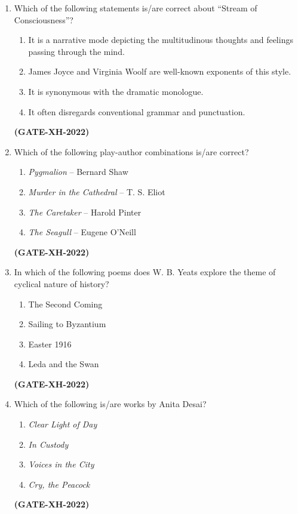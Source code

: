 \documentclass[journal]{IEEEtran}
\begin{document}
\begin{enumerate}
\item Which of the following statements is/are correct about ``Stream of Consciousness''?
\begin{enumerate}
\item It is a narrative mode depicting the multitudinous thoughts and feelings passing through the mind.
\item James Joyce and Virginia Woolf are well-known exponents of this style.
\item It is synonymous with the dramatic monologue.
\item It often disregards conventional grammar and punctuation.
\end{enumerate}
\hfill\textbf{(GATE-XH-2022)}

\item Which of the following play-author combinations is/are correct?
\begin{multicols}{2}
\begin{enumerate}
\item \textit{Pygmalion} – Bernard Shaw
\item \textit{Murder in the Cathedral} – T. S. Eliot
\item \textit{The Caretaker} – Harold Pinter
\item \textit{The Seagull} – Eugene O’Neill
\end{enumerate}
\end{multicols}
\hfill\textbf{(GATE-XH-2022)}

\item In which of the following poems does W. B. Yeats explore the theme of cyclical nature of history?
\begin{multicols}{2}
\begin{enumerate}
\item The Second Coming
\item Sailing to Byzantium
\item Easter 1916
\item Leda and the Swan
\end{enumerate}
\end{multicols}
\hfill\textbf{(GATE-XH-2022)}

\item Which of the following is/are works by Anita Desai?
\begin{multicols}{2}
\begin{enumerate}
\item \textit{Clear Light of Day}
\item \textit{In Custody}
\item \textit{Voices in the City}
\item \textit{Cry, the Peacock}
\end{enumerate}
\end{multicols}
\hfill\textbf{(GATE-XH-2022)}


\end{enumerate}
\end{document}
